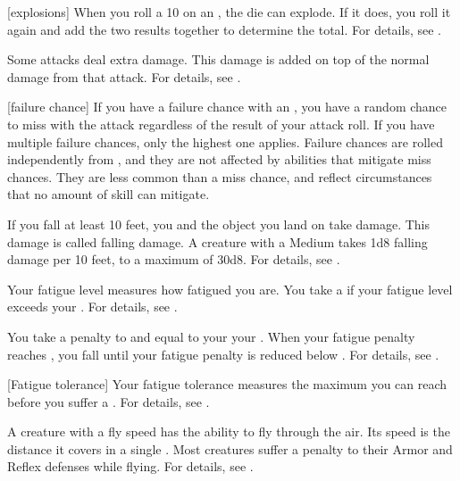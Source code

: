 [explosions] When you roll a 10 on an , the die can explode.
If it does, you roll it again and add the two results together to determine the total.
For details, see .

 Some attacks deal extra damage.
This damage is added on top of the normal damage from that attack.
For details, see .

[failure chance] If you have a failure chance with an , you have a random chance to miss with the attack regardless of the result of your attack roll.
If you have multiple failure chances, only the highest one applies.
Failure chances are rolled independently from , and they are not affected by abilities that mitigate miss chances.
They are less common than a miss chance, and reflect circumstances that no amount of skill can mitigate.

 If you fall at least 10 feet, you and the object you land on take damage.
This damage is called falling damage.
A creature with a Medium  takes 1d8 falling damage per 10 feet, to a maximum of 30d8.
For details, see .

 Your fatigue level measures how fatigued you are.
You take a  if your fatigue level exceeds your .
For details, see .

 You take a penalty to  and  equal to your  \sub your .
When your fatigue penalty reaches , you fall \unconscious until your fatigue penalty is reduced below .
For details, see .

[Fatigue tolerance] Your fatigue tolerance measures the maximum  you can reach before you suffer a .
For details, see .

 A creature with a fly speed has the ability to fly through the air.
Its speed is the distance it covers in a single .
Most creatures suffer a  penalty to their Armor and Reflex defenses while flying.
For details, see .

